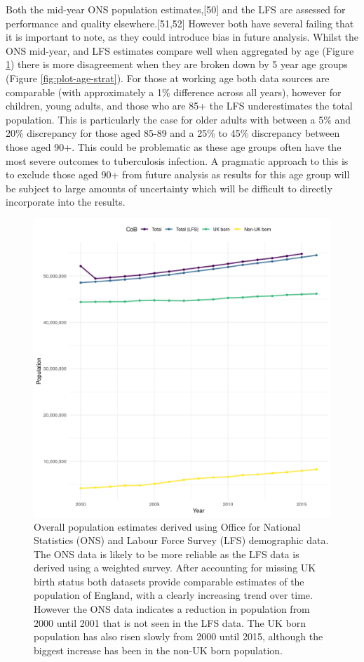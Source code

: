 \documentclass[11pt,twoside]{bristolthesis}
\begin{document}
  Both the mid-year ONS population estimates,{[}50{]} and the LFS are assessed for performance and quality elsewhere.{[}51,52{]} However both have several failing that it is important to note, as they could introduce bias in future analysis. Whilst the ONS mid-year, and LFS estimates compare well when aggregated by age (Figure \ref{fig:plot-overall-pop}) there is more disagreement when they are broken down by 5 year age groups (Figure \ref{fig:plot-age-strat}). For those at working age both data sources are comparable (with approximately a 1\% difference across all years), however for children, young adults, and those who are 85+ the LFS underestimates the total population. This is particularly the case for older adults with between a 5\% and 20\% discrepancy for those aged 85-89 and a 25\% to 45\% discrepancy between those aged 90+. This could be problematic as these age groups often have the most severe outcomes to tuberculosis infection. A pragmatic approach to this is to exclude those aged 90+ from future analysis as results for this age group will be subject to large amounts of uncertainty which will be difficult to directly incorporate into the results.
  \begin{figure}
  
  {\centering \includegraphics[width=0.8\linewidth]{chapters/tb-epi-england/figures/plot-overall-pop} 
  
  }
  
  \caption{Overall population estimates derived using Office for National Statistics (ONS) and Labour Force Survey (LFS) demographic data. The ONS data is likely to be more reliable as the LFS data is derived using a weighted survey. After accounting for missing UK birth status both datasets provide comparable estimates of the population of England, with a clearly increasing trend over time. However the ONS data indicates a reduction in population from 2000 until 2001 that is not seen in the LFS data. The UK born population has also risen slowly from 2000 until 2015, although the biggest increase has been in the non-UK born population.}\label{fig:plot-overall-pop}
  \end{figure}
\end{document}
